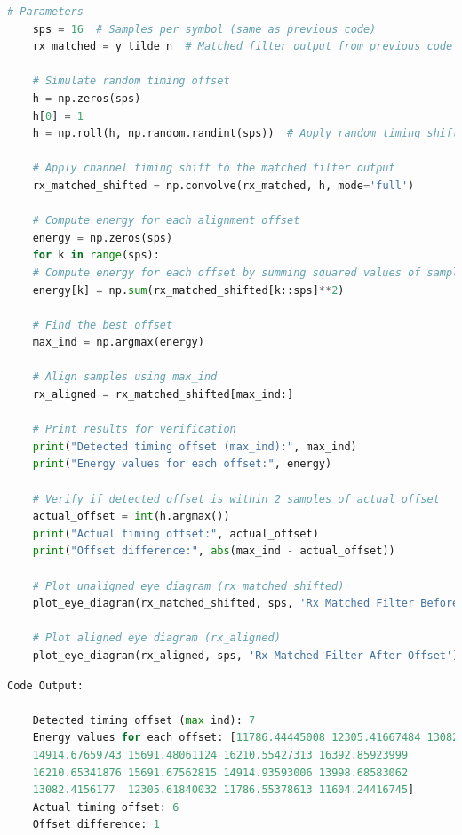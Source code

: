 \documentclass[
	letterpaper, %
	10pt, %
]{CSUniSchoolLabReport}
\begin{document}
\begin{lstlisting}[language=Python]
	# Parameters
	sps = 16  # Samples per symbol (same as previous code)
	rx_matched = y_tilde_n  # Matched filter output from previous code
	
	# Simulate random timing offset
	h = np.zeros(sps)
	h[0] = 1
	h = np.roll(h, np.random.randint(sps))  # Apply random timing shift
	
	# Apply channel timing shift to the matched filter output
	rx_matched_shifted = np.convolve(rx_matched, h, mode='full')
	
	# Compute energy for each alignment offset
	energy = np.zeros(sps)
	for k in range(sps):
	# Compute energy for each offset by summing squared values of sampled segments
	energy[k] = np.sum(rx_matched_shifted[k::sps]**2)
	
	# Find the best offset
	max_ind = np.argmax(energy)
	
	# Align samples using max_ind
	rx_aligned = rx_matched_shifted[max_ind:]
	
	# Print results for verification
	print("Detected timing offset (max_ind):", max_ind)
	print("Energy values for each offset:", energy)
	
	# Verify if detected offset is within 2 samples of actual offset
	actual_offset = int(h.argmax())
	print("Actual timing offset:", actual_offset)
	print("Offset difference:", abs(max_ind - actual_offset))
	
	# Plot unaligned eye diagram (rx_matched_shifted)
	plot_eye_diagram(rx_matched_shifted, sps, 'Rx Matched Filter Before Offset')
	
	# Plot aligned eye diagram (rx_aligned)
	plot_eye_diagram(rx_aligned, sps, 'Rx Matched Filter After Offset')
\end{lstlisting}

\begin{lstlisting}[language=Python]
	Code Output:
	
	Detected timing offset (max ind): 7
	Energy values for each offset: [11786.44445008 12305.41667484 13082.15279012 13998.40271725
	14914.67659743 15691.48061124 16210.55427313 16392.85923999
	16210.65341876 15691.67562815 14914.93593006 13998.68583062
	13082.4156177  12305.61840032 11786.55378613 11604.24416745]
	Actual timing offset: 6
	Offset difference: 1
\end{lstlisting}
\end{document}
